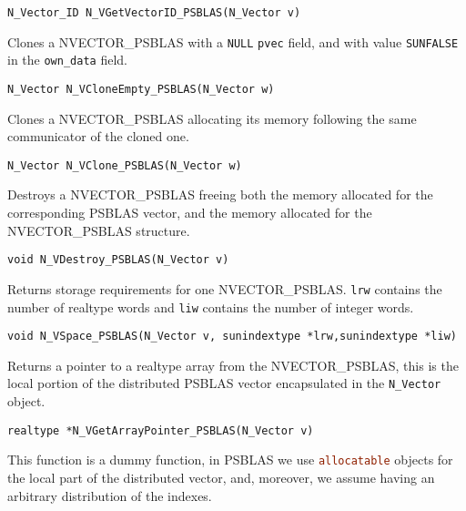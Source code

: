 \documentclass[twoside,a4paper]{refart}
\begin{document}
\begin{description}
	 \lstinline[style=CStyle]|N_Vector_ID N_VGetVectorID_PSBLAS(N_Vector v)|
 	
 	\item[\fbox{\texttt{N\_VCloneEmpty\_PSBLAS}}] Clones a NVECTOR\_PSBLAS with a \lstinline[style=CStyle]|NULL| \lstinline[style=CStyle]|pvec| field, and with value \lstinline[style=CStyle]|SUNFALSE| in the \lstinline[style=CStyle]|own_data| field.
 	
 	 \lstinline[style=CStyle]|N_Vector N_VCloneEmpty_PSBLAS(N_Vector w)|
 	
 	\item[\fbox{\texttt{N\_VClone\_PSBLAS}}] Clones a NVECTOR\_PSBLAS allocating its memory following the same communicator of the cloned one.
 	
 	 \lstinline[style=CStyle]|N_Vector N_VClone_PSBLAS(N_Vector w)|
 	
 	\item[\fbox{\texttt{N\_VDestroy\_PSBLAS}}] Destroys a NVECTOR\_PSBLAS freeing both the memory allocated for the corresponding PSBLAS vector, and the memory allocated for the NVECTOR\_PSBLAS structure.
 	
 	 \lstinline[style=CStyle]|void N_VDestroy_PSBLAS(N_Vector v)|
 	
 	\item[\fbox{\texttt{N\_VSpace\_PSBLAS}}] Returns storage requirements for one NVECTOR\_PSBLAS. \lstinline[style=CStyle]|lrw| contains the number of realtype words and \lstinline[style=CStyle]|liw| contains the number of integer words.
 	
 	 \lstinline[style=CStyle]|void N_VSpace_PSBLAS(N_Vector v, sunindextype *lrw,sunindextype *liw)|
 	
 	\item[\fbox{\texttt{N\_VGetArrayPointer\_PSBLAS}}] Returns a pointer to a realtype array from the NVECTOR\_PSBLAS, this is the local portion of the distributed PSBLAS vector encapsulated in the \texttt{N\_Vector} object.
 	
 	 \lstinline[style=CStyle]|realtype *N_VGetArrayPointer_PSBLAS(N_Vector v)|
 	
 	\item[\fbox{\texttt{N\_VSetArrayPointer\_PSBLAS}}] This function is a dummy function, in PSBLAS we use \lstinline[language=Fortran]|allocatable| objects for the local part of the distributed vector, and, moreover, we assume having an arbitrary distribution of the indexes.
 	

\end{description}
\end{document}
